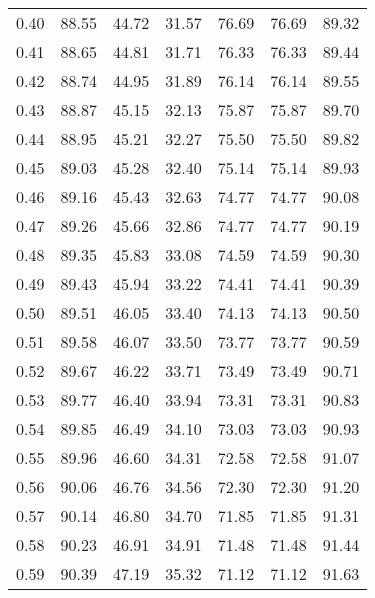 \begin{tabular}{|c|c|c|c|c|c|c|}
      0.40 &     88.55 &     44.72 &      31.57 &   76.69 &      76.69 &         89.32 \\
      0.41 &     88.65 &     44.81 &      31.71 &   76.33 &      76.33 &         89.44 \\
      0.42 &     88.74 &     44.95 &      31.89 &   76.14 &      76.14 &         89.55 \\
      0.43 &     88.87 &     45.15 &      32.13 &   75.87 &      75.87 &         89.70 \\
      0.44 &     88.95 &     45.21 &      32.27 &   75.50 &      75.50 &         89.82 \\
      0.45 &     89.03 &     45.28 &      32.40 &   75.14 &      75.14 &         89.93 \\
      0.46 &     89.16 &     45.43 &      32.63 &   74.77 &      74.77 &         90.08 \\
      0.47 &     89.26 &     45.66 &      32.86 &   74.77 &      74.77 &         90.19 \\
      0.48 &     89.35 &     45.83 &      33.08 &   74.59 &      74.59 &         90.30 \\
      0.49 &     89.43 &     45.94 &      33.22 &   74.41 &      74.41 &         90.39 \\
      0.50 &     89.51 &     46.05 &      33.40 &   74.13 &      74.13 &         90.50 \\
      0.51 &     89.58 &     46.07 &      33.50 &   73.77 &      73.77 &         90.59 \\
      0.52 &     89.67 &     46.22 &      33.71 &   73.49 &      73.49 &         90.71 \\
      0.53 &     89.77 &     46.40 &      33.94 &   73.31 &      73.31 &         90.83 \\
      0.54 &     89.85 &     46.49 &      34.10 &   73.03 &      73.03 &         90.93 \\
      0.55 &     89.96 &     46.60 &      34.31 &   72.58 &      72.58 &         91.07 \\
      0.56 &     90.06 &     46.76 &      34.56 &   72.30 &      72.30 &         91.20 \\
      0.57 &     90.14 &     46.80 &      34.70 &   71.85 &      71.85 &         91.31 \\
      0.58 &     90.23 &     46.91 &      34.91 &   71.48 &      71.48 &         91.44 \\
      0.59 &     90.39 &     47.19 &      35.32 &   71.12 &      71.12 &         91.63 \\

\end{tabular}
